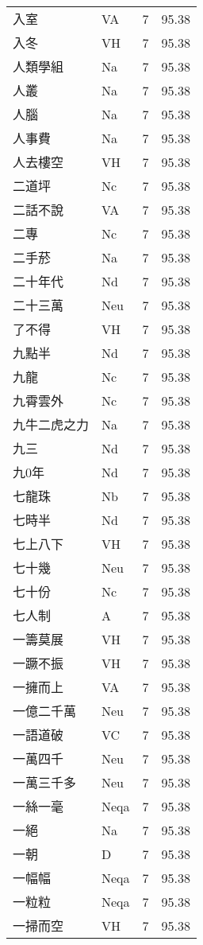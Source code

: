 \documentclass[twocolumn]{book}
\begin{document}
\begin{supertabular}{llrr}
入室 & VA & 7 &  95.38\\
入冬 & VH & 7 &  95.38\\
人類學組 & Na & 7 &  95.38\\
人叢 & Na & 7 &  95.38\\
人腦 & Na & 7 &  95.38\\
人事費 & Na & 7 &  95.38\\
人去樓空 & VH & 7 &  95.38\\
二道坪 & Nc & 7 &  95.38\\
二話不說 & VA & 7 &  95.38\\
二專 & Nc & 7 &  95.38\\
二手菸 & Na & 7 &  95.38\\
二十年代 & Nd & 7 &  95.38\\
二十三萬 & Neu & 7 &  95.38\\
了不得 & VH & 7 &  95.38\\
九點半 & Nd & 7 &  95.38\\
九龍 & Nc & 7 &  95.38\\
九霄雲外 & Nc & 7 &  95.38\\
九牛二虎之力 & Na & 7 &  95.38\\
九三 & Nd & 7 &  95.38\\
九0年 & Nd & 7 &  95.38\\
七龍珠 & Nb & 7 &  95.38\\
七時半 & Nd & 7 &  95.38\\
七上八下 & VH & 7 &  95.38\\
七十幾 & Neu & 7 &  95.38\\
七十份 & Nc & 7 &  95.38\\
七人制 & A & 7 &  95.38\\
一籌莫展 & VH & 7 &  95.38\\
一蹶不振 & VH & 7 &  95.38\\
一擁而上 & VA & 7 &  95.38\\
一億二千萬 & Neu & 7 &  95.38\\
一語道破 & VC & 7 &  95.38\\
一萬四千 & Neu & 7 &  95.38\\
一萬三千多 & Neu & 7 &  95.38\\
一絲一毫 & Neqa & 7 &  95.38\\
一絕 & Na & 7 &  95.38\\
一朝 & D & 7 &  95.38\\
一幅幅 & Neqa & 7 &  95.38\\
一粒粒 & Neqa & 7 &  95.38\\
一掃而空 & VH & 7 &  95.38\\

\end{supertabular}
\end{document}
